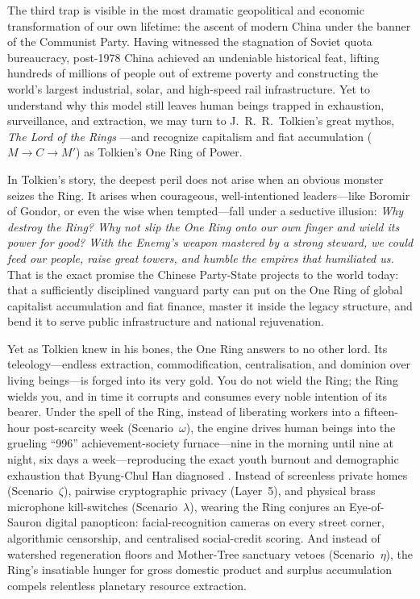 The third trap is visible in the most dramatic geopolitical and economic transformation of our own lifetime: the ascent of modern China under the banner of the Communist Party. Having witnessed the stagnation of Soviet quota bureaucracy, post-1978 China achieved an undeniable historical feat, lifting hundreds of millions of people out of extreme poverty and constructing the world's largest industrial, solar, and high-speed rail infrastructure. Yet to understand why this model still leaves human beings trapped in exhaustion, surveillance, and extraction, we may turn to J.~R.~R.~Tolkien's great mythos, \textit{The Lord of the Rings} \parencite{tolkien1954}---and recognize capitalism and fiat accumulation ($M \to C \to M'$) as Tolkien's One Ring of Power.

In Tolkien's story, the deepest peril does not arise when an obvious monster seizes the Ring. It arises when courageous, well-intentioned leaders---like Boromir of Gondor, or even the wise when tempted---fall under a seductive illusion: \textit{Why destroy the Ring? Why not slip the One Ring onto our own finger and wield its power for good? With the Enemy's weapon mastered by a strong steward, we could feed our people, raise great towers, and humble the empires that humiliated us.} That is the exact promise the Chinese Party-State projects to the world today: that a sufficiently disciplined vanguard party can put on the One Ring of global capitalist accumulation and fiat finance, master it inside the legacy structure, and bend it to serve public infrastructure and national rejuvenation.

Yet as Tolkien knew in his bones, the One Ring answers to no other lord. Its teleology---endless extraction, commodification, centralisation, and dominion over living beings---is forged into its very gold. You do not wield the Ring; the Ring wields you, and in time it corrupts and consumes every noble intention of its bearer. Under the spell of the Ring, instead of liberating workers into a fifteen-hour post-scarcity week (Scenario~$\omega$), the engine drives human beings into the grueling ``996'' achievement-society furnace---nine in the morning until nine at night, six days a week---reproducing the exact youth burnout and demographic exhaustion that Byung-Chul Han diagnosed \parencite{han2015}. Instead of screenless private homes (Scenario~$\zeta$), pairwise cryptographic privacy (Layer~5), and physical brass microphone kill-switches (Scenario~$\lambda$), wearing the Ring conjures an Eye-of-Sauron digital panopticon: facial-recognition cameras on every street corner, algorithmic censorship, and centralised social-credit scoring. And instead of watershed regeneration floors and Mother-Tree sanctuary vetoes (Scenario~$\eta$), the Ring's insatiable hunger for gross domestic product and surplus accumulation compels relentless planetary resource extraction.

